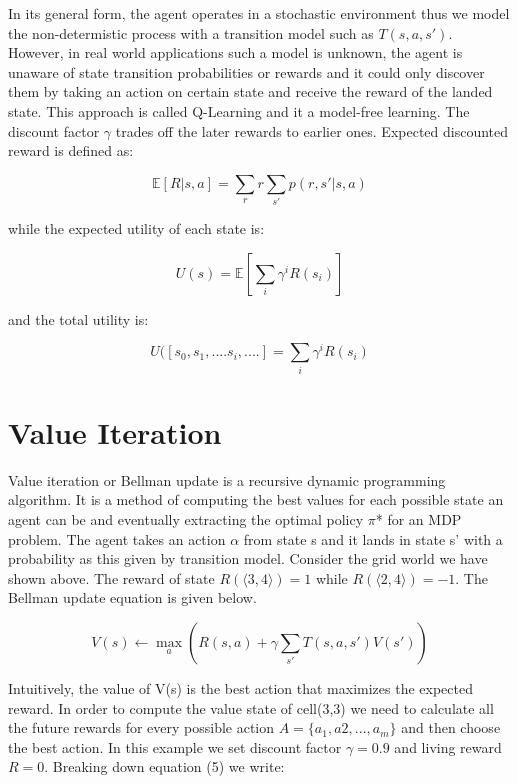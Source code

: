 \documentclass[10pt,a4paper,twocolumn]{article}
\begin{document}
	In its general form, the agent operates in a stochastic environment thus we model the non-determistic process with a transition model such as $T(s,a,s')$. However, in real world applications such a model is unknown, the agent is unaware of state transition probabilities or rewards and it could only discover them by taking an action on certain state and receive the reward of the landed state. This approach is called Q-Learning and it a model-free learning. The discount factor $\gamma$ trades off the later rewards to earlier ones. Expected discounted reward is defined as:
	
	\begin{equation}
		\mathbb{E}[R | s,a] = \sum_{r}r \sum_{s'}p(r, s' | s, a)
	\end{equation}
	
	while the expected utility of each state is:
	
	\begin{equation}
		U(s) = \mathbb{E}[ \sum_{i}\gamma^{i}R(s_{i})]
	\end{equation}
	
	
	and the total utility is:
	
	\begin{equation}
		U([s_{0}, s_{1}, .... s_{i}, ....] = \sum_{i}\gamma^{i}R(s_{i})
	\end{equation}
	
	\section{Value Iteration}
	Value iteration or Bellman update is a recursive dynamic programming algorithm. It is a method of computing the best values for each possible state an agent can be and eventually extracting the optimal policy $\pi$* for an MDP problem. The agent takes an action $\alpha$ from state s and it lands in state s’ with a probability as this given by transition model. Consider the grid world we have shown above. The reward of state $R(\big \langle 3,4 \big \rangle) = 1$ while $R(\big \langle 2,4 \big \rangle) = -1$. The Bellman update equation is given below.
	
	\begin{equation}
		V(s) \leftarrow \max_{a} { ( R(s,a) + \gamma \sum_{s'}T(s,a,s')V(s') )}
	\end{equation}
	
	Intuitively, the value of V(s) is the best action that maximizes the expected reward. In order to compute the value state of cell(3,3) we need to calculate all the  future rewards for every possible action $A = \{ a_{1}, a{2}, ..., a_{m} \}$ and then choose the best action. In this example we set discount factor $\gamma = 0.9$ and living reward $R=0$. Breaking down equation (5) we write:
	
\end{document}
